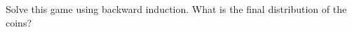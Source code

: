 \documentclass[12pt]{article}
\begin{document}
Solve this game using backward induction. What is the final distribution of the coins?
%
%

%
\end{document}
